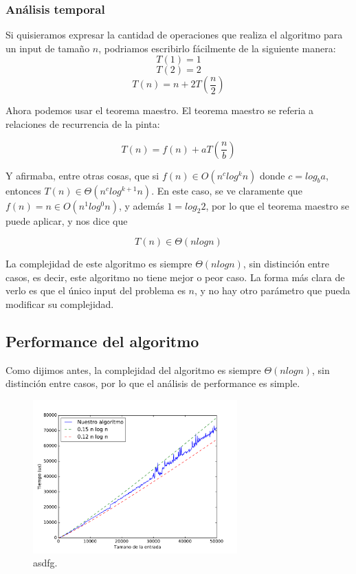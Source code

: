 \subsubsection{Análisis temporal}
Si quisieramos expresar la cantidad de operaciones que realiza el algoritmo para un input de tamaño $n$, podriamos escribirlo fácilmente de la siguiente manera:
\[T(1) = 1\]
\[T(2) = 2\]
\[T(n) = n + 2 T \left(\frac{n}{2}\right)\]

Ahora podemos usar el teorema maestro. El teorema maestro se referia a relaciones de recurrencia de la pinta:

\[T(n) = f(n) + a T\left(\frac{n}{b}\right)\]

Y afirmaba, entre otras cosas, que si $f(n) \in O(n^c log^k n)$ donde $c = log_b a$, entonces $T(n) \in \Theta(n^c log^{k+1} n)$. En este caso, se ve claramente que $f(n) = n \in O(n^1 log^0 n)$, y además $1 = log_2 2$, por lo que el teorema maestro se puede aplicar, y nos dice que

\[T(n) \in \Theta(n log n)\]

La complejidad de este algoritmo es siempre $\Theta(n logn)$, sin distinción entre casos, es decir, este algoritmo no tiene mejor o peor caso. La forma más clara de verlo es que el único input del problema es $n$, y no hay otro parámetro que pueda modificar su complejidad.

\subsection{Performance del algoritmo}

Como dijimos antes, la complejidad del algoritmo es siempre $\Theta(n logn)$, sin distinción entre casos, por lo que el análisis de performance es simple.

\begin{figure}[H]
 \centering
	\includegraphics[width=0.7\textwidth]{img/tiempos/kaioken3.pdf}
	\caption{\footnotesize asdfg.}
	\label{fig:kaioken-tiempos3}
\end{figure}

